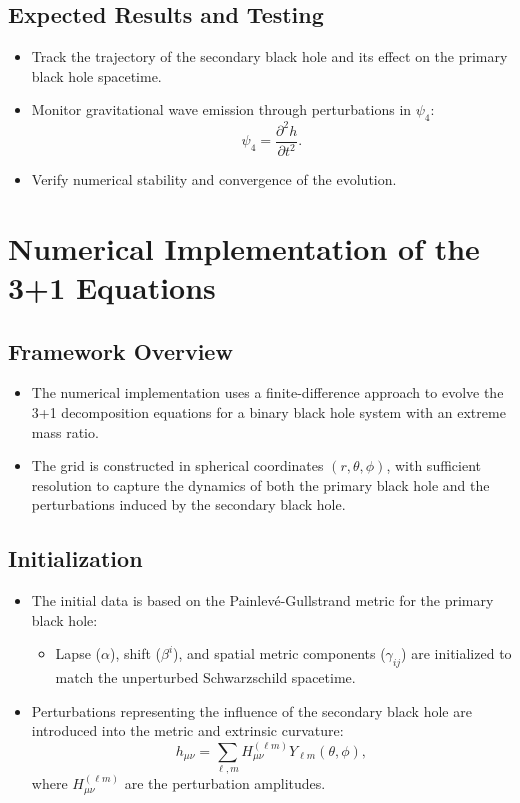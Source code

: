 \documentclass[12pt]{article}
\begin{document}
\subsection{Expected Results and Testing}
\begin{itemize}
    \item Track the trajectory of the secondary black hole and its effect on the primary black hole spacetime.
    \item Monitor gravitational wave emission through perturbations in $\psi_4$:
    \[
    \psi_4 = \frac{\partial^2 h}{\partial t^2}.
    \]
    \item Verify numerical stability and convergence of the evolution.
\end{itemize}

\section{Numerical Implementation of the 3+1 Equations}

\subsection{Framework Overview}
\begin{itemize}
    \item The numerical implementation uses a finite-difference approach to evolve the 3+1 decomposition equations for a binary black hole system with an extreme mass ratio.
    \item The grid is constructed in spherical coordinates $(r, \theta, \phi)$, with sufficient resolution to capture the dynamics of both the primary black hole and the perturbations induced by the secondary black hole.
\end{itemize}

\subsection{Initialization}
\begin{itemize}
    \item The initial data is based on the Painlevé-Gullstrand metric for the primary black hole:
    \begin{itemize}
        \item Lapse ($\alpha$), shift ($\beta^i$), and spatial metric components ($\gamma_{ij}$) are initialized to match the unperturbed Schwarzschild spacetime.
    \end{itemize}
    \item Perturbations representing the influence of the secondary black hole are introduced into the metric and extrinsic curvature:
    \[
    h_{\mu\nu} = \sum_{\ell, m} H_{\mu\nu}^{(\ell m)} Y_{\ell m}(\theta, \phi),
    \]
    where $H_{\mu\nu}^{(\ell m)}$ are the perturbation amplitudes.
\end{itemize}
\end{document}
